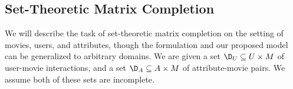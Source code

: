 


\subsection{Set-Theoretic Matrix Completion}

We will describe the task of set-theoretic matrix completion on the setting of movies, users, and attributes, though the formulation and our proposed model can be generalized to arbitrary domains.
We are given a set $\D_U \subseteq U \times M$ of user-movie interactions, and a set $\D_A \subseteq A \times M$ of attribute-movie pairs. We assume both of these sets are incomplete.

